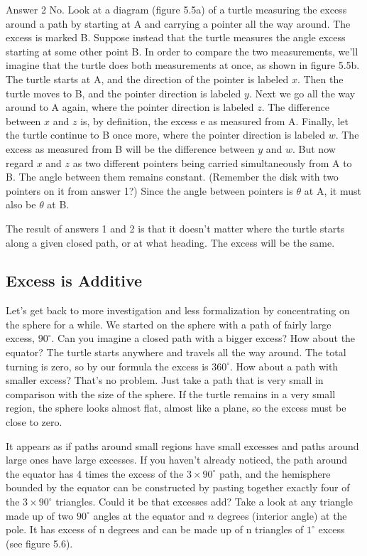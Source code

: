 \documentclass{book}
\begin{document}
Answer 2 No. Look at a diagram (figure 5.5a) of a turtle measuring the
excess around a path by starting at A and carrying a pointer all the
way around. The excess is marked B. Suppose instead that the turtle
measures the angle excess starting at some other point B. In order to
compare the two measurements, we'll imagine that the turtle does both
measurements at once, as shown in figure 5.5b. The turtle starts at A,
and the direction of the pointer is labeled $x$. Then the turtle moves to B,
and the pointer direction is labeled $y$. Next we go all the way around to
A again, where the pointer direction is labeled $z$. The difference between
$x$ and $z$ is, by definition, the excess e as measured from A. Finally,
let the turtle continue to B once more, where the pointer direction is
labeled $w$. The excess as measured from B will be the difference between
$y$ and $w$. But now regard $x$ and $z$ as two different pointers being carried
simultaneously from A to B. The angle between them remains constant.
(Remember the disk with two pointers on it from answer 1?) Since the
angle between pointers is $\theta$ at A, it must also be $\theta$ at B.

The result of answers 1 and 2 is that it doesn't matter where the turtle
starts along a given closed path, or at what heading. The excess will be
the same.

\subsection{Excess is Additive}

Let's get back to more investigation and less formalization by concentrating on the sphere for a while. We started on the sphere with
a path of fairly large excess, $90^{\circ}$. Can you imagine a closed path with a
bigger excess? How about the equator? The turtle starts anywhere and
travels all the way around. The total turning is zero, so by our formula
the excess is $360^{\circ}$. How about a path with smaller excess? That's no
problem. Just take a path that is very small in comparison with the size
of the sphere. If the turtle remains in a very small region, the sphere
looks almost flat, almost like a plane, so the excess must be close to
zero.

It appears as if paths around small regions have small excesses and
paths around large ones have large excesses. If you haven't already
noticed, the path around the equator has 4 times the excess of the $3 \times 90^{\circ}$
path, and the hemisphere bounded by the equator can be constructed by
pasting together exactly four of the $3 \times 90^{\circ}$ triangles. Could it be that
excesses add? Take a look at any triangle made up of two $90^{\circ}$ angles at
the equator and $n$ degrees (interior angle) at the pole. It has excess of n
degrees and can be made up of n triangles of $1^{\circ}$ excess (see figure 5.6).
\end{document}
